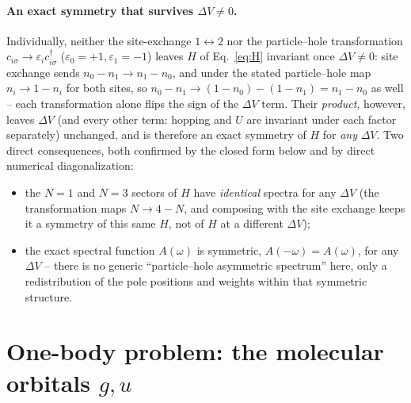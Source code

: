 \documentclass[11pt]{article}
\begin{document}
\paragraph{An exact symmetry that survives $\Delta V\neq0$.} Individually, neither the
site-exchange $1\leftrightarrow2$ nor the particle--hole transformation
$c_{i\sigma}\to\varepsilon_ic^{\dagger}_{i\sigma}$ ($\varepsilon_0=+1,\varepsilon_1=-1$)
leaves $H$ of Eq.~\eqref{eq:H} invariant once $\Delta V\neq0$: site exchange sends
$n_0-n_1\to n_1-n_0$, and under the stated particle--hole map $n_i\to1-n_i$ for both
sites, so $n_0-n_1\to(1-n_0)-(1-n_1)=n_1-n_0$ as well -- each transformation alone flips
the sign of the $\Delta V$ term. Their \emph{product}, however, leaves $\Delta V$ (and
every other term: hopping and $U$ are invariant under each factor separately) unchanged,
and is therefore an exact symmetry of $H$ for \emph{any} $\Delta V$. Two direct
consequences, both confirmed by the closed form below and by direct numerical
diagonalization:
\begin{itemize}
  \item the $N{=}1$ and $N{=}3$ sectors of $H$ have \emph{identical} spectra for any
    $\Delta V$ (the transformation maps $N\to4-N$, and composing with the site exchange
    keeps it a symmetry of this same $H$, not of $H$ at a different $\Delta V$);
  \item the exact spectral function $A(\omega)$ is symmetric, $A(-\omega)=A(\omega)$, for
    any $\Delta V$ -- there is no generic ``particle--hole asymmetric spectrum'' here, only
    a redistribution of the pole positions and weights within that symmetric structure.
\end{itemize}

\section{One-body problem: the molecular orbitals $g,u$}
\label{sec:oneboy}
\end{document}
